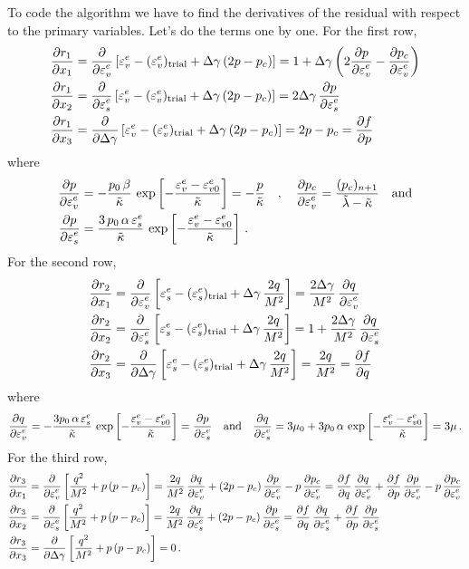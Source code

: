 To code the algorithm we have to find the derivatives of the residual with respect to the primary variables.
Let's do the terms one by one.  For the first row,
\[
  \Bal
  \Partial{r_1}{x_1} & = \Partial{}{\Ve_v^e}\left[\Ve_v^e -  (\Ve_v^e)_\Trial + \Delta\gamma\,(2p-p_c)\right] 
     = 1 + \Delta\gamma\left(2\Partial{p}{\Ve_v^e} - \Partial{p_c}{\Ve_v^e}\right) \\
  \Partial{r_1}{x_2} & = \Partial{}{\Ve_s^e}\left[\Ve_v^e -  (\Ve_v^e)_\Trial + \Delta\gamma\,(2p-p_c)\right] 
     = 2\Delta\gamma\,\Partial{p}{\Ve_s^e}\\
  \Partial{r_1}{x_3} & = \Partial{}{\Delta\gamma}\left[\Ve_v^e -  (\Ve_v^e)_\Trial + \Delta\gamma\,(2p-p_c)\right]
     = 2p - p_c = \Partial{f}{p}
  \Eal
\]
where
\[
  \Bal
   \Partial{p}{\Ve_v^e} & = -\frac{p_0\,\beta}{\kappatilde}\,\exp\left[-\frac{\Ve_v^e - \Ve_{v0}^e}{\kappatilde}\right] = -\frac{p}{\kappatilde} \quad, \quad
   \Partial{p_c}{\Ve_v^e} = \frac{(p_c)_{n+1}}{\lambdatilde-\kappatilde} \quad \Tand \\
   \Partial{p}{\Ve_s^e} & = \frac{3\,p_0\,\alpha\,\Ve_s^e}{\kappatilde}\,\exp\left[-\frac{\Ve_v^e - \Ve_{v0}^e}{\kappatilde}\right] \,.
  \Eal
\]
For the second row,
\[
  \Bal
  \Partial{r_2}{x_1} & = \Partial{}{\Ve_v^e}\left[\Ve_s^e -  (\Ve_s^e)_\Trial + \Delta\gamma\,\frac{2q}{M^2}\right] 
     = \frac{2\Delta\gamma}{M^2}\,\Partial{q}{\Ve_v^e} \\
  \Partial{r_2}{x_2} & = \Partial{}{\Ve_s^e}\left[\Ve_s^e -  (\Ve_s^e)_\Trial + \Delta\gamma\,\frac{2q}{M^2}\right] 
     = 1 + \frac{2\Delta\gamma}{M^2}\,\Partial{q}{\Ve_s^e}\\
  \Partial{r_2}{x_3} & = \Partial{}{\Delta\gamma}\left[\Ve_s^e -  (\Ve_s^e)_\Trial + \Delta\gamma\,\frac{2q}{M^2}\right]
     = \frac{2q}{M^2} = \Partial{f}{q}
  \Eal
\]
where
\[
  \Partial{q}{\Ve_v^e} = -\frac{3p_0\,\alpha\,\Ve_s^e}{\kappatilde}\,\exp\left[-\frac{\Ve_v^e - \Ve_{v0}^e}{\kappatilde}\right] = \Partial{p}{\Ve_s^e}
  \quad \Tand \quad 
  \Partial{q}{\Ve_s^e} = 3\mu_0 + 3p_0\,\alpha\,\exp\left[-\frac{\Ve_v^e - \Ve_{v0}^e}{\kappatilde}\right] = 3\mu \,.
\]
For the third row, 
\[
  \Bal
  \Partial{r_3}{x_1} & = \Partial{}{\Ve_v^e}\left[\frac{q^2}{M^2} + p\,(p - p_c)\right]
     = \frac{2q}{M^2}\,\Partial{q}{\Ve_v^e} + (2p - p_c)\,\Partial{p}{\Ve_v^e} - p\,\Partial{p_c}{\Ve_v^e} 
     = \Partial{f}{q}\,\Partial{q}{\Ve_v^e} + \Partial{f}{p}\,\Partial{p}{\Ve_v^e} - p\,\Partial{p_c}{\Ve_v^e} \\
  \Partial{r_3}{x_2} & = \Partial{}{\Ve_s^e}\left[\frac{q^2}{M^2} + p\,(p - p_c)\right]
     = \frac{2q}{M^2}\,\Partial{q}{\Ve_s^e} + (2p - p_c)\,\Partial{p}{\Ve_s^e} 
     = \Partial{f}{q}\,\Partial{q}{\Ve_s^e} + \Partial{f}{p}\,\Partial{p}{\Ve_s^e} \\
  \Partial{r_3}{x_3} & = \Partial{}{\Delta\gamma}\left[\frac{q^2}{M^2} + p\,(p - p_c)\right]
     =  0 \,.
  \Eal
\]
